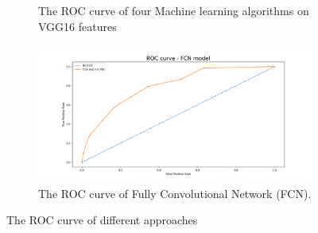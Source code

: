 \begin{figure}
\begin{subfigure}[b]{0.45\textwidth}
         \caption{The ROC curve of four Machine learning algorithms on VGG16 features}
         \label{fig:ROC_vgg}
     \end{subfigure}
     \hfill
     \begin{subfigure}[b]{.45\textwidth}
         \centering
         \includegraphics[width=1\textwidth]{manuscript/src/figures/project/roc_curve_FCN.png}
         \caption{The ROC curve of Fully Convolutional Network (FCN).}
         \label{fig:ROC_fcn}
     \end{subfigure} 
        \caption{The ROC curve of different approaches}
        \label{fig:ROC}
\end{figure}


